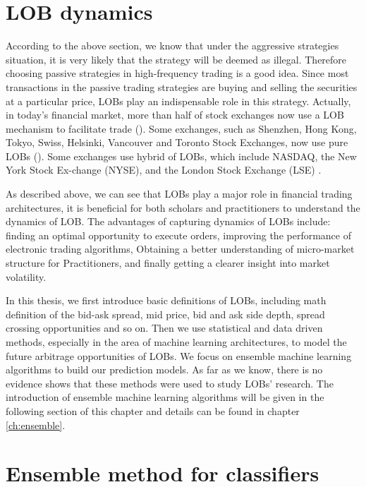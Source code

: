 \section{LOB dynamics}
According to the above section,  we know that under the aggressive strategies situation,  it is very likely that the strategy will be deemed as illegal. Therefore choosing passive strategies in high-frequency trading is a good idea. Since most transactions in the passive trading strategies are buying and selling the securities at a particular price,  LOBs play an indispensable role in this strategy.  
Actually,  in today's financial market,  more than half of stock exchanges now use a LOB mechanism to facilitate trade  (\cite{rosu2009dynamic}).  Some exchanges,  such as Shenzhen, Hong Kong,  Tokyo,  Swiss,  Helsinki,   Vancouver  and Toronto
 Stock Exchanges,  now use pure LOBs  (\cite{luckock2001statistical}). Some exchanges use hybrid of LOBs,  which include  NASDAQ, the New York Stock Ex-change (NYSE),   and the London Stock Exchange
 (LSE) \citep{cont2010stochastic}. 

As described above,  we can see that LOBs play a major role in financial trading architectures,  it is beneficial for both scholars and practitioners to understand the dynamics of LOB. The advantages of capturing dynamics of LOBs include: finding an optimal opportunity to execute orders\citep{obizhaeva2013optimal}, improving the performance of electronic trading algorithms\citep{engle2006measuring}, Obtaining a better understanding of micro-market structure for Practitioners\citep{harris2003trading}, and finally getting a clearer insight into market volatility\citep{kirilenko2015flash}.

In this thesis,  we first introduce basic definitions of LOBs,  including math definition of the bid-ask spread,  mid price,  bid and ask side depth,  spread crossing opportunities and so on. Then we use statistical and data driven methods,  especially in the area of machine learning architectures,  to model the future arbitrage opportunities of LOBs. We focus on ensemble machine learning algorithms to build our prediction models. As far as we know,  there is no evidence shows that these methods were used to study LOBs' research. The introduction of ensemble machine learning algorithms will be given in the following section of this chapter and details can be found in chapter \ref{ch:ensemble}.  


\section{Ensemble method for classifiers}

